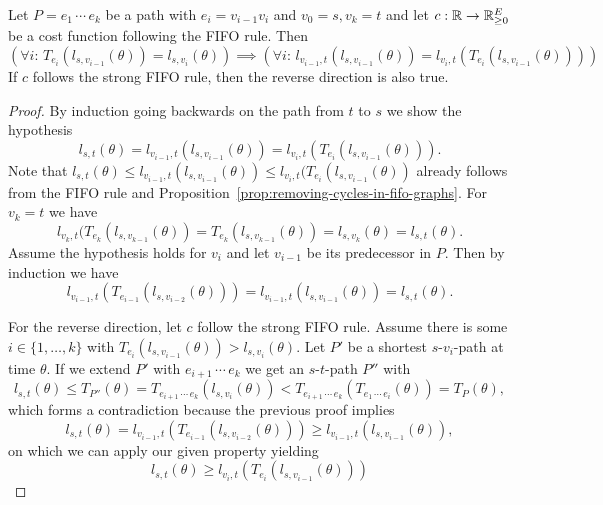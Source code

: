 \begin{proposition}
    Let $P=e_1\,\cdots\,e_k$ be a path with $e_i = v_{i-1}v_{i}$ and $v_0 = s, v_k= t$ and let $c:\mathbb{R}\rightarrow\mathbb{R}^E_{\geq0}$ be a cost function following the FIFO rule. Then
    \[ 
        \left(\forall i:\, T_{e_i}(l_{s,v_{i-1}}(\theta)) = l_{s,v_i}(\theta)\right)
        \implies
        \left(\forall i:\, l_{v_{i-1},t}(l_{s,v_{i-1}}(\theta)) = l_{v_{i},t}(T_{e_i}(l_{s,v_{i-1}}(\theta)))\right)
    \]
    If $c$ follows the strong FIFO rule, then the reverse direction is also true.
\end{proposition}
\begin{proof}
    By induction going backwards on the path from $t$ to $s$ we show the hypothesis
    \[
        l_{s,t}(\theta) = l_{v_{i-1},t}(l_{s,v_{i-1}}(\theta)) = l_{v_{i},t}(T_{e_i}(l_{s,v_{i-1}}(\theta))).
    \]
    Note that $l_{s,t}(\theta) \leq l_{v_{i-1},t}(l_{s,v_{i-1}}(\theta))\leq l_{v_i, t}(T_{e_i}(l_{s,v_{i-1}}(\theta))$ already follows from the FIFO rule and Proposition~\ref{prop:removing-cycles-in-fifo-graphs}.
    For $v_k=t$ we have \[
        l_{v_k, t}(T_{e_k}(l_{s,v_{k-1}}(\theta)) = T_{e_k}(l_{s,v_{k-1}}(\theta)) = l_{s,v_k}(\theta) = l_{s,t}(\theta).
    \]
    Assume the hypothesis holds for $v_i$ and let $v_{i-1}$ be its predecessor in $P$.
    Then by induction we have \[
        l_{v_{i-1},t}(T_{e_{i-1}}(l_{s,v_{i-2}}(\theta)))
        = l_{v_{i-1},t}(l_{s,v_{i-1}}(\theta)) = l_{s,t}(\theta).
    \]
    
    For the reverse direction, let $c$ follow the strong FIFO rule.
    Assume there is some $i\in\{1,\dots, k\}$ with $T_{e_i}(l_{s,v_{i-1}}(\theta)) > l_{s,v_i}(\theta)$.
    Let $P'$ be a shortest $s$-$v_i$-path at time $\theta$.
    If we extend $P'$ with $e_{i+1}\,\cdots\,e_{k}$ we get an $s$-$t$-path $P''$ with \[
        l_{s,t}(\theta) \leq T_{P''}(\theta)
        = T_{e_{i+1}\,\cdots\,e_k}(l_{s,v_{i}}(\theta))
        < T_{e_{i+1}\,\cdots\,e_k}(T_{e_1\,\cdots\,e_i}(\theta))
        = T_P(\theta),
    \]
    which forms a contradiction because the previous proof implies \[
        l_{s,t}(\theta)
        = l_{v_{i-1},t}(T_{e_{i-1}}(l_{s,v_{i-2}}(\theta)))
        \geq l_{v_{i-1},t}(l_{s,v_{i-1}}(\theta)),
    \]
    on which we can apply our given property yielding \[
        l_{s,t}(\theta) \geq 
        l_{v_{i},t}(T_{e_i}(l_{s,v_{i-1}}(\theta)))
    \]
\end{proof}
\fi